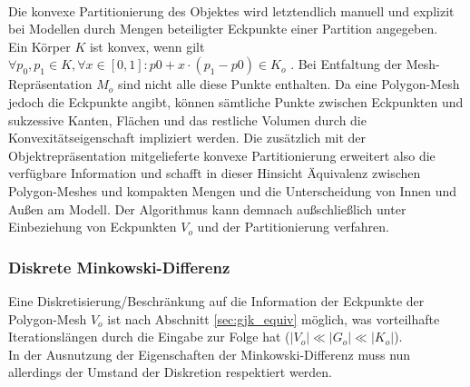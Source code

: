 \ \\
Die konvexe Partitionierung des Objektes wird letztendlich manuell und explizit bei Modellen durch Mengen beteiligter Eckpunkte einer Partition angegeben.\\
Ein Körper $K$ ist konvex, wenn gilt $\forall p_0, p_1 \in K, \forall x \in [0,1] : p0 + x \cdot  (p_1 - p0) \in K_o $ \cite[p.121]{morris2015finite}. Bei Entfaltung der Mesh-Repräsentation $M_o$ sind nicht alle diese Punkte enthalten. Da eine Polygon-Mesh jedoch die Eckpunkte angibt, können sämtliche Punkte zwischen Eckpunkten und sukzessive Kanten, Flächen und das restliche Volumen durch die Konvexitätseigenschaft impliziert werden. Die zusätzlich mit der Objektrepräsentation mitgelieferte konvexe Partitionierung erweitert also die verfügbare Information und schafft in dieser Hinsicht Äquivalenz zwischen Polygon-Meshes und kompakten Mengen und die Unterscheidung von Innen und Außen am Modell. Der Algorithmus kann demnach außschließlich unter Einbeziehung von Eckpunkten $V_o$ und der Partitionierung verfahren.

\subsubsection{Diskrete Minkowski-Differenz}
Eine Diskretisierung/Beschränkung auf die Information der Eckpunkte der Polygon-Mesh $V_o$ ist nach Abschnitt \ref{sec:gjk_equiv} möglich, was vorteilhafte Iterationslängen durch die Eingabe zur Folge hat ($|V_o| \ll |G_o| \ll |K_o|$).\\
In der Ausnutzung der Eigenschaften der Minkowski-Differenz muss nun allerdings der Umstand der Diskretion respektiert werden.

